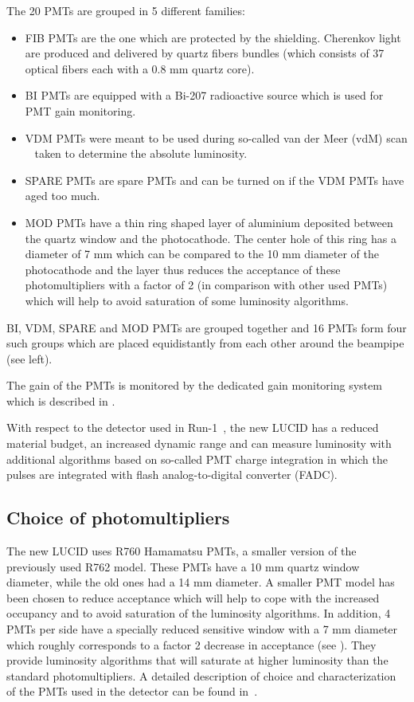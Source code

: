 The 20 PMTs are grouped in 5 different families:
\begin{itemize}
 \item FIB PMTs are the one which are protected by the shielding. Cherenkov light are produced and delivered by quartz fibers bundles 
 (which consists of 37 optical fibers each with a 0.8 mm quartz core).
 \item BI PMTs are equipped with a Bi-207 radioactive source which is used for PMT gain monitoring. 
 \item VDM PMTs were meant to be used during so-called van der Meer (vdM) scan ~\cite{vanderMeer:296752,Rubbia:1025746} taken to determine the absolute luminosity.
 \item SPARE PMTs are spare PMTs and can be turned on if the VDM PMTs have aged too much.
 \item MOD PMTs have a thin ring shaped layer of aluminium deposited between the quartz window and the photocathode. 
 The center hole of this ring has a diameter of 7 mm which can be compared to the 10 mm diameter of the photocathode 
 and the layer thus reduces the acceptance of these photomultipliers with a factor of 2 (in comparison with other used PMTs) 
 which will help to avoid saturation of some luminosity algorithms.
\end{itemize}

BI, VDM, SPARE and MOD PMTs are grouped together and 16 PMTs form four such groups which are placed equidistantly from each other around the beampipe (see  left).

The gain of the PMTs is monitored by the dedicated gain monitoring system which is described in .

With respect to the detector used in Run-1~\cite{Aad:2013ucp}, the new LUCID has a reduced material budget, 
an increased dynamic range and can measure luminosity with additional algorithms based on so-called PMT charge integration in which the pulses are integrated with 
flash analog-to-digital converter (FADC).

\subsection{Choice of photomultipliers}
\label{subsec:PMTChoice}


The new LUCID uses R760 Hamamatsu PMTs, a smaller version of the previously used R762 model. These PMTs have a 
10 mm quartz window diameter, while the old ones had a 14 mm diameter. A smaller PMT model has been chosen to reduce acceptance 
which will help to cope with the increased occupancy and to avoid saturation of the luminosity algorithms.
In addition, 4 PMTs per side have a specially reduced sensitive window with a 7 mm diameter which roughly 
corresponds to a factor 2 decrease in acceptance (see ). They provide luminosity algorithms that will saturate at 
higher luminosity than the standard photomultipliers. A detailed description of choice and characterization of the PMTs used in the detector can be found in~\cite{Alberghi:2016tad}.

